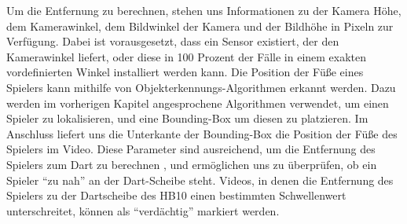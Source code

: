 Um die Entfernung zu berechnen, stehen uns Informationen zu der Kamera Höhe, dem Kamerawinkel, dem Bildwinkel der Kamera und der Bildhöhe in Pixeln zur Verfügung. Dabei ist vorausgesetzt, dass ein Sensor
existiert, der den Kamerawinkel liefert, oder diese in 100 Prozent der Fälle in einem exakten vordefinierten Winkel installiert werden kann. Die Position der Füße eines Spielers kann mithilfe von Objekterkennungs-Algorithmen
erkannt werden. Dazu werden im vorherigen Kapitel angesprochene Algorithmen verwendet, um einen Spieler zu lokalisieren, und eine Bounding-Box um diesen zu platzieren. Im Anschluss liefert uns die Unterkante der Bounding-Box
die Position der Füße des Spielers im Video. Diese Parameter sind ausreichend, um die Entfernung des Spielers zum Dart zu berechnen \parencite{joglekar_2011_depth}, und ermöglichen uns zu überprüfen, ob ein Spieler \enquote{zu nah} an der Dart-Scheibe steht.
Videos, in denen die Entfernung des Spielers zu der Dartscheibe des HB10 einen bestimmten Schwellenwert unterschreitet, können als \enquote{verdächtig} markiert werden.

\vspace{1em}